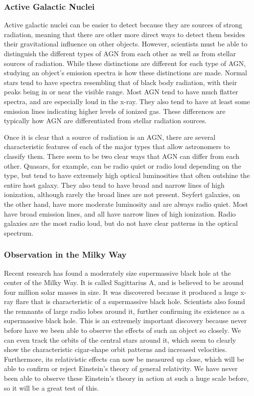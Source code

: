 \documentclass[12pt]{article}
\begin{document}
    \subsubsection{Active Galactic Nuclei}
    Active galactic nuclei can be easier to detect because they are sources of
    strong radiation, meaning that there are other more direct ways to detect
    them besides their gravitational influence on other objects.  However,
    scientists must be able to distinguish the different types of AGN from each
    other as well as from stellar sources of radiation.  While these
    distinctions are different for each type of AGN, studying an object's
    emission spectra is how these distinctions are made.  Normal stars tend to
    have spectra resembling that of black body radiation, with their peaks being
    in or near the visible range.  Most AGN tend to have much flatter spectra,
    and are especially loud in the x-ray.  They also tend to have at least some
    emission lines indicating higher levels of ionized gas.  These differences are
    typically how AGN are differentiated from stellar radiation sources.

    Once it is clear that a source of radiation is an AGN, there are several
    characteristic features of each of the major types that allow astronomers to
    classify them.  There seem to be two clear ways that AGN can differ from
    each other.  Quasars, for example, can be radio quiet or radio loud
    depending on the type, but tend to have extremely high optical luminosities
    that often outshine the entire host galaxy.  They also tend to
    have broad and narrow lines of high ionization, although rarely the broad
    lines are not present.  Seyfert galaxies, on the other hand, have more
    moderate luminosity and are always radio quiet.  Most have
    broad emission lines, and all have narrow lines of high ionization.  Radio
    galaxies are the most radio loud, but do not have clear patterns in the
    optical spectrum.

    \subsubsection{Observation in the Milky Way}
    Recent research has found a moderately size supermassive black hole at the
    center of the Milky Way.  It is called Sagittarius A, and is believed to be
    around four million solar masses in size.  It was discovered because it
    produced a huge x-ray flare that is characteristic of a supermassive black
    hole.  Scientists also found the remnants of large radio lobes around it,
    further confirming its existence as a supermassive black hole.  This is an
    extremely important discovery because never before have we been able to
    observe the effects of such an object so closely.  We can even track the
    orbits of the central stars around it, which seem to clearly show the
    characteristic cigar-shape orbit patterns and increased velocities.
    Furthermore, its relativistic effects can now be measured up close, which
    will be able to confirm or reject Einstein's theory of general relativity.
    We have never been able to observe these Einstein's theory in action at such
    a huge scale before,
    so it will be a great test of this.
\end{document}
